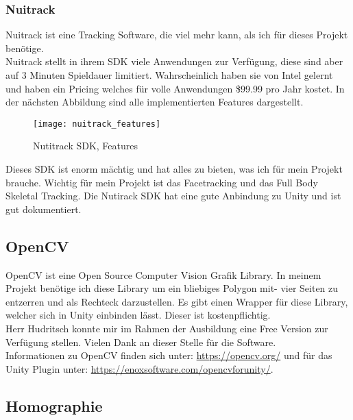 			
			
\subsubsection{Nuitrack}
Nuitrack ist eine Tracking Software, die viel mehr kann, als ich für dieses Projekt benötige. \\
Nuitrack stellt in ihrem SDK viele Anwendungen zur Verfügung, diese sind aber auf 3 Minuten Spieldauer limitiert. Wahrscheinlich haben sie von Intel gelernt und haben ein Pricing welches für volle Anwendungen \$99.99 pro Jahr kostet. In der nächsten Abbildung sind alle implementierten Features dargestellt.

\begin{figure}[H]
\texttt{[image: nuitrack\_features]}
\caption{Nutitrack SDK, Features}
\label{fig:Nuitrack Features}
\end{figure}

Dieses SDK ist enorm mächtig und hat alles zu bieten, was ich für mein Projekt brauche. Wichtig für mein Projekt ist das Facetracking und das Full Body Skeletal Tracking. Die Nutirack SDK hat eine gute Anbindung zu Unity und ist gut dokumentiert.
\cite{NuitrackSDK} 

\subsection{OpenCV}

OpenCV ist eine Open Source Computer Vision Grafik Library. In meinem Projekt benötige ich diese Library um ein bliebiges Polygon mit- vier Seiten zu entzerren und als Rechteck darzustellen. Es gibt einen Wrapper für diese Library, welcher sich in Unity einbinden lässt. 
Dieser ist kostenpflichtig. \\ Herr Hudritsch konnte mir im Rahmen der Ausbildung eine Free Version zur Verfügung stellen. Vielen Dank an dieser Stelle für die Software. \\
Informationen zu OpenCV finden sich unter: \href{https://opencv.org/}{https://opencv.org/} und für das Unity Plugin unter: \href{https://enoxsoftware.com/opencvforunity/}{https://enoxsoftware.com/opencvforunity/}.
			
\subsection{Homographie}

\vspace{0.5in}


